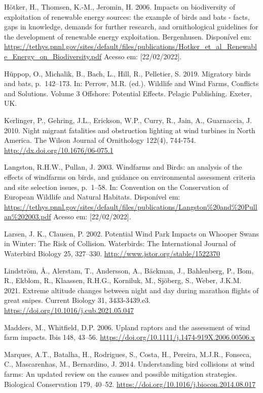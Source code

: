 \documentclass[
  oneside]{scrbook}
\begin{document}
Hötker, H., Thomsen, K.-M., Jeromin, H. 2006. Impacts on biodiversity of exploitation of renewable energy sources: the example of birds and bats - facts, gaps in knowledge, demands for further research, and ornithological guidelines for the development of renewable energy exploitation. Bergenhusen. Disponível em: \url{https://tethys.pnnl.gov/sites/default/files/publications/Hotker_et_al_Renewable_Energy_on_Biodiversity.pdf} Acesso em: {[}22/02/2022{]}.

Hüppop, O., Michalik, B., Bach, L., Hill, R., Pelletier, S. 2019. Migratory birds and bats, p.~142--173. In: Perrow, M.R. (ed.). Wildlife and Wind Farms, Conflicts and Solutions. Volume 3 Offshore: Potential Effects. Pelagic Publishing. Exeter, UK.

Kerlinger, P., Gehring, J.L., Erickson, W.P., Curry, R., Jain, A., Guarnaccia, J. 2010. Night migrant fatalities and obstruction lighting at wind turbines in North America. The Wilson Journal of Ornithology 122(4), 744-754. \url{http://dx.doi.org/10.1676/06-075.1}

Langston, R.H.W., Pullan, J. 2003. Windfarms and Birds: an analysis of the effects of windfarms on birds, and guidance on environmental assessment criteria and site selection issues, p.~1--58. In: Convention on the Conservation of European Wildlife and Natural Habitats. Disponível em: \url{https://tethys.pnnl.gov/sites/default/files/publications/Langston\%20and\%20Pullan\%202003.pdf} Acesso em: {[}22/02/2022{]}.

Larsen, J. K., Clausen, P. 2002. Potential Wind Park Impacts on Whooper Swans in Winter: The Risk of Collision. Waterbirds: The International Journal of Waterbird Biology 25, 327--330. \url{http://www.jstor.org/stable/1522370}

Lindström, Å., Alerstam, T., Andersson, A., Bäckman, J., Bahlenberg, P., Bom, R., Ekblom, R., Klaassen, R.H.G., Korniluk, M., Sjöberg, S., Weber, J.K.M. 2021. Extreme altitude changes between night and day during marathon flights of great snipes. Current Biology 31, 3433-3439.e3. \url{https://doi.org/10.1016/j.cub.2021.05.047}

Madders, M., Whitfield, D.P. 2006. Upland raptors and the assessment of wind farm impacts. Ibis 148, 43--56. \url{https://doi.org/10.1111/j.1474-919X.2006.00506.x}

Marques, A.T., Batalha, H., Rodrigues, S., Costa, H., Pereira, M.J.R., Fonseca, C., Mascarenhas, M., Bernardino, J. 2014. Understanding bird collisions at wind farms: An updated review on the causes and possible mitigation strategies. Biological Conservation 179, 40--52. \url{https://doi.org/10.1016/j.biocon.2014.08.017}
\end{document}
